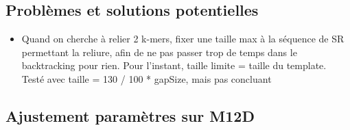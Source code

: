 \documentclass[12pt]{article}
\begin{document}
\subsection{Problèmes et solutions potentielles}

\begin{itemize}
	\item Quand on cherche à relier 2 k-mers, fixer une taille max à la séquence de SR permettant la reliure, afin de ne pas passer trop de temps
		  dans le backtracking pour rien. Pour l'instant, taille limite = taille du template. Testé avec taille = 130 / 100 * gapSize, mais pas concluant
\end{itemize}

\subsection{Ajustement paramètres sur M12D}
\end{document}
